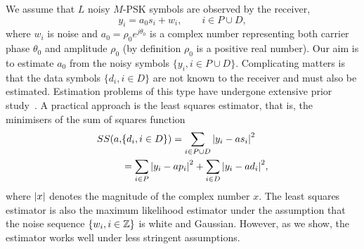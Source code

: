 \documentclass[journal]{IEEEtran}
\begin{document}
We assume that %
$L$ noisy $M$-PSK symbols are observed by the receiver,  %
\begin{equation}\label{eq:sigmod}
y_i = a_0 s_i + w_i, \qquad i \in P \cup D,
\end{equation}
where $w_i$ is noise and $a_0 = \rho_0 e^{j\theta_0}$ is a complex number representing both carrier phase $\theta_0$ and amplitude $\rho_0$ (by definition $\rho_0$ is a positive real number).  Our aim is to estimate $a_0$ from the noisy symbols $\{ y_i, i \in P \cup D \}$.  Complicating matters is that the data symbols $\{d_i, i \in D\}$ are not known to the receiver and must also be estimated.  Estimation problems of this type have undergone extensive prior study~\cite{ViterbiViterbi_phase_est_1983,Cowley_ref_sym_carr_1998,Wilson1989,Makrakis1990,Liu1991,Mackenthun1994,Sweldens2001,McKilliamLinearTimeBlockPSK2009,Divsalar1990,580211,974597,Mengali_andre_synchro_book}.  A practical approach is the least squares estimator, that is, the minimisers of the sum of squares function
\begin{equation}\label{eq:SSdefn}
\begin{split}
SS(a, &\{d_i, i \in D\}) = \sum_{i \in P \cup D} {\left\vert  y_i - a s_i  \right\vert}^2  \\
&= \sum_{i \in P} {\left\vert  y_i - a p_i  \right\vert}^2 + \sum_{i \in D} {\left\vert  y_i - a d_i  \right\vert}^2,
\end{split}
\end{equation}
where ${\left\vert x \right\vert}$ denotes the magnitude of the complex number $x$.  The least squares estimator is also the maximum likelihood estimator under the assumption that the noise sequence $\{w_i, i \in {\mathbb Z}\}$ is white and Gaussian.  However, as we show, the estimator works well under less stringent assumptions.  %
\end{document}
